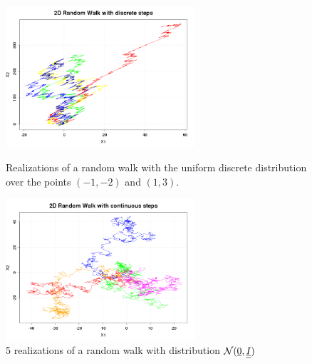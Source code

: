 \begin{figure}[H]
  \begin{minipage}{9cm}
    \begin{center}
      \includegraphics[width=7cm]{randomwalk2D_discrete.png}
      \caption{Realizations of a random walk with the uniform discrete distribution over the points $(-1, -2)$ and $(1,3)$.}
      \label{randomwalk2D_Discrete}
    \end{center}
  \end{minipage}
  \hfill
  \begin{minipage}{9cm}
    \begin{center}
      \includegraphics[width=7cm]{randomwalk2D_continuous.png}
      \caption{5 realizations of a random walk with distribution $\mathcal{N}({\underline{0}},{\underline{\underline{I}}})$}
      \label{randomwalk2D_Continuous}
    \end{center}
  \end{minipage}
\end{figure}
